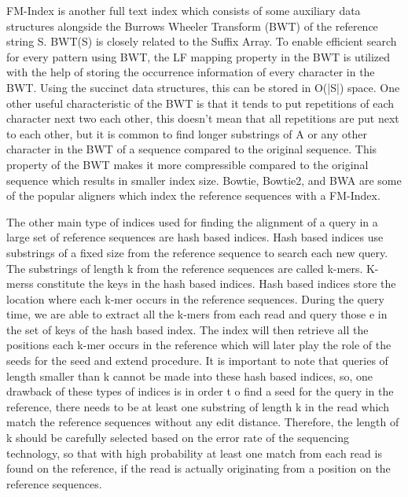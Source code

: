 FM-Index is another full text index which consists of some auxiliary 
data structures alongside the Burrows Wheeler Transform (BWT) of the reference 
string S. BWT(S) is closely related to the Suffix Array. To enable efficient 
search for every pattern using BWT, the LF mapping property in the BWT is 
utilized with the help of storing the occurrence information of every character 
in the BWT. Using the succinct data structures, this can be stored in O(|S|) 
space. One other useful characteristic of the BWT is that it tends to put 
repetitions of each character next two each other, this doesn’t mean that all 
repetitions are put next to each other, but it is common to find longer 
substrings of A or any other character in the BWT of a sequence compared to the original sequence. This property of the BWT makes it more compressible compared to the original sequence which results in smaller index size. Bowtie, Bowtie2, and BWA are some of the popular aligners which index the reference sequences with a FM-Index.

The other main type of indices used for finding the alignment of a query in a 
large set of reference sequences are hash based indices. Hash based indices use 
substrings of a fixed size from the reference sequence to search each new query. 
The substrings of length k from the reference sequences are called k-mers. 
K-merss constitute the keys in the hash based indices. Hash based indices store 
the location where each k-mer occurs in the reference sequences. During the 
query time, we are able to extract all the k-mers from each read and query 
those e in the set of keys of the hash based index. The index will then 
retrieve all the positions each k-mer occurs in the reference which will 
later play the role of the seeds for the seed and extend procedure. It is 
important to note that queries of length smaller than k cannot be made into 
these hash based indices, so, one drawback of these types of indices is in 
order t o find a seed for the query  in the reference, there needs to be at 
least one substring of length k in the read which match the reference sequences 
without any edit distance. Therefore, the length of k should be carefully 
selected based on the error rate of the sequencing technology, so that with high 
probability at least one match from each read is found on the reference, if the 
read is actually originating from a position on the reference sequences.

